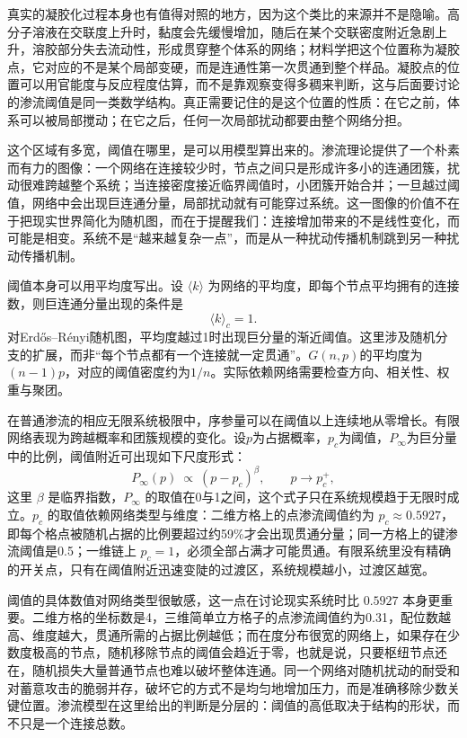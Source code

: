 真实的凝胶化过程本身也有值得对照的地方，因为这个类比的来源并不是隐喻。高分子溶液在交联度上升时，黏度会先缓慢增加，随后在某个交联密度附近急剧上升，溶胶部分失去流动性，形成贯穿整个体系的网络；材料学把这个位置称为凝胶点，它对应的不是某个局部变硬，而是连通性第一次贯通到整个样品。凝胶点的位置可以用官能度与反应程度估算，而不是靠观察变得多稠来判断，这与后面要讨论的渗流阈值是同一类数学结构。真正需要记住的是这个位置的性质：在它之前，体系可以被局部搅动；在它之后，任何一次局部扰动都要由整个网络分担。


这个区域有多宽，阈值在哪里，是可以用模型算出来的。渗流理论提供了一个朴素而有力的图像：一个网络在连接较少时，节点之间只是形成许多小的连通团簇，扰动很难跨越整个系统；当连接密度接近临界阈值时，小团簇开始合并；一旦越过阈值，网络中会出现巨连通分量，局部扰动就有可能穿过系统\cite{broadbent1957,erdos1959}。这一图像的价值不在于把现实世界简化为随机图，而在于提醒我们：连接增加带来的不是线性变化，而可能是相变。系统不是“越来越复杂一点”，而是从一种扰动传播机制跳到另一种扰动传播机制。

阈值本身可以用平均度写出。设 $\langle k\rangle$ 为网络的平均度，即每个节点平均拥有的连接数，则巨连通分量出现的条件是
\begin{equation}
\langle k\rangle_c = 1 .
\end{equation}
对Erd\H{o}s--R\'enyi随机图，平均度越过1时出现巨分量的渐近阈值。这里涉及随机分支的扩展，而非“每个节点都有一个连接就一定贯通”。$G(n,p)$的平均度为$(n-1)p$，对应的阈值密度约为$1/n$。实际依赖网络需要检查方向、相关性、权重与聚团。

在普通渗流的相应无限系统极限中，序参量可以在阈值以上连续地从零增长。有限网络表现为跨越概率和团簇规模的变化。设$p$为占据概率，$p_c$为阈值，$P_\infty$为巨分量中的比例，阈值附近可出现如下尺度形式：
\begin{equation}
P_\infty(p)\ \propto\ (p-p_c)^{\beta},\qquad p\to p_c^{+},
\end{equation}
这里 $\beta$ 是临界指数，$P_\infty$ 的取值在0与1之间，这个式子只在系统规模趋于无限时成立。$p_c$ 的取值依赖网络类型与维度：二维方格上的点渗流阈值约为 $p_c\approx 0.5927$，即每个格点被随机占据的比例要超过约59\%才会出现贯通分量；同一方格上的键渗流阈值是0.5；一维链上 $p_c=1$，必须全部占满才可能贯通。有限系统里没有精确的开关点，只有在阈值附近迅速变陡的过渡区，系统规模越小，过渡区越宽。

阈值的具体数值对网络类型很敏感，这一点在讨论现实系统时比 $0.5927$ 本身更重要。二维方格的坐标数是4，三维简单立方格子的点渗流阈值约为0.31，配位数越高、维度越大，贯通所需的占据比例越低；而在度分布很宽的网络上，如果存在少数度极高的节点，随机移除节点的阈值会趋近于零，也就是说，只要枢纽节点还在，随机损失大量普通节点也难以破坏整体连通\cite{albert2000error}。同一个网络对随机扰动的耐受和对蓄意攻击的脆弱并存，破坏它的方式不是均匀地增加压力，而是准确移除少数关键位置。渗流模型在这里给出的判断是分层的：阈值的高低取决于结构的形状，而不只是一个连接总数。

